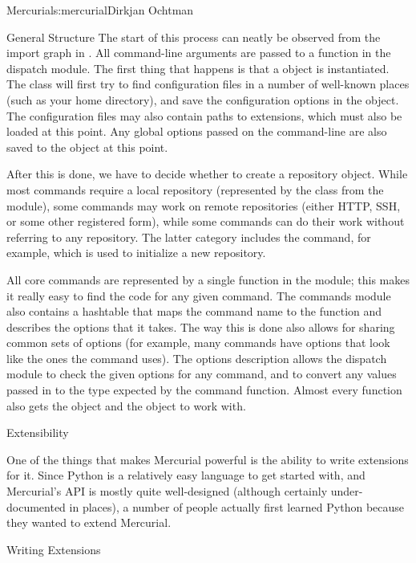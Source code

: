 \begin{aosachapter}{Mercurial}{s:mercurial}{Dirkjan Ochtman}
\begin{aosasect1}{General Structure}
The start of this process can neatly be observed from the import graph
in . All command-line arguments are
passed to a function in the dispatch module. The first thing that
happens is that a  object is instantiated. The 
class will first try to find configuration files in a number of
well-known places (such as your home directory), and save the
configuration options in the  object. The configuration files
may also contain paths to extensions, which must also be loaded at
this point. Any global options passed on the command-line are also
saved to the  object at this point.

After this is done, we have to decide whether to create a repository
object. While most commands require a local repository (represented
by the  class from the  module), some
commands may work on remote repositories (either HTTP, SSH, or some
other registered form), while some commands can do their work without
referring to any repository. The latter category includes the
 command, for example, which is used to initialize a new
repository.

All core commands are represented by a single function in the
 module; this makes it really easy to find the code for
any given command. The commands module also contains a hashtable that
maps the command name to the function and describes the options that
it takes. The way this is done also allows for sharing common sets of
options (for example, many commands have options that look like the
ones the  command uses). The options description allows the
dispatch module to check the given options for any command, and to
convert any values passed in to the type expected by the command
function. Almost every function also gets the  object and the
 object to work with.

\end{aosasect1}

\begin{aosasect1}{Extensibility}

One of the things that makes Mercurial powerful is the ability to
write extensions for it. Since Python is a relatively easy language to
get started with, and Mercurial's API is mostly quite well-designed
(although certainly under-documented in places), a number of people
actually first learned Python because they wanted to extend Mercurial.

\begin{aosasect2}{Writing Extensions}


\end{aosasect2}
\end{aosasect1}
\end{aosachapter}

